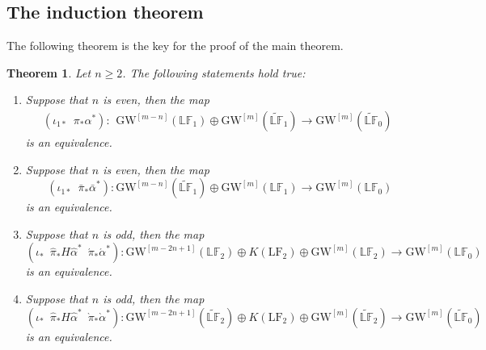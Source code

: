 \documentclass[a4paper]{amsart}
\theoremstyle{plain}
\newtheorem{theorem}{Theorem}[section]
\theoremstyle{definition}
\numberwithin{equation}{section}
\newcommand{\GW}{\mathrm{GW}}
\newcommand{\LF}{\mathrm{LF}}
\begin{document}
\subsection{The induction theorem}

The following theorem is the key for the proof of the main theorem.
\begin{theorem}\label{thm:lg_induc}
    Let $n\geq 2$. The following statements hold true:
    \begin{enumerate}[leftmargin=20pt,label={\rm (\alph*)},ref=(\alph*)]
        \item Suppose that $n$ is even, then the map
              \[     (\iota_{1*} \,\,\, \pi_*\alpha^*):   \begin{array}{cll}
                      \GW^{[m-n]}(\mathbb{LF}_{1}) \oplus \GW^{[m]}(\widetilde{\mathbb{LF}}_{1})  \xrightarrow{  }
                      \GW^{[m]}(\widetilde{\mathbb{LF}}_0)
                  \end{array}
              \]
              is an equivalence.
        \item Suppose that $n$ is even, then the map
              \[
                  (\iota_{1*} \,\,\, \bar{\pi}_*\bar{\alpha}^*): \GW^{[m-n]}(\widetilde{\mathbb{LF}}_{1}) \oplus  \GW^{[m]}(\mathbb{LF}_{1})      \xrightarrow{ } \GW^{[m]}(\mathbb{LF}_{0})
              \]
              is an equivalence.
        \item Suppose that $n$ is odd, then the map
              \[
                  (\iota_{*} \,\,\, \hat{\pi}_* H \hat{\alpha}^* \,\,\, \acute{\pi}_* \acute{\alpha}^*):  \GW^{[m-2n+1]}(\mathbb{LF}_{2}) \oplus K(\LF_{2}) \oplus \GW^{[m]}(\mathbb{LF}_{2}) \xrightarrow{ } \GW^{[m]}(\mathbb{LF}_0)
              \]
              is an equivalence.
        \item Suppose that $n$ is odd, then the map
              \[
                  (\iota_{*} \,\,\, \hat{\pi}_* H \hat{\alpha}^* \,\,\,  \grave{\pi}_* \grave{\alpha}^*): 	\GW^{[m-2n+1]}(\widetilde{\mathbb{LF}}_{2}) \oplus K(\LF_{2}) \oplus \GW^{[m]}(\widetilde{\mathbb{LF}}_{2})
                  \xrightarrow{ }  \GW^{[m]}(\widetilde{\mathbb{LF}}_0)
              \]
              is an equivalence.
    \end{enumerate}
\end{theorem}
\end{document}

